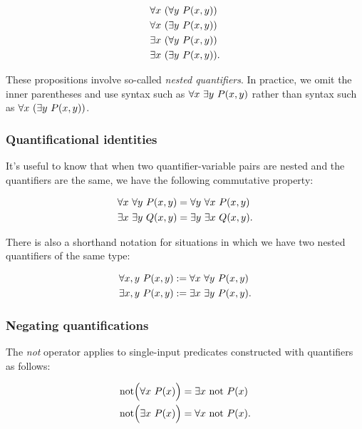 \begin{align*}
    &\forall x \text{ } (\forall y \text{ } P(x, y)) \\
    &\forall x \text{ } (\exists y \text{ } P(x, y)) \\
    &\exists x \text{ } (\forall y \text{ } P(x, y)) \\
    &\exists x \text{ } (\exists y \text{ } P(x, y)).
\end{align*}

These propositions involve so-called \textit{nested quantifiers}. In practice, we omit the inner parentheses and use syntax such as $\forall x \text{ } \exists y \text{ } P(x, y)$ rather than syntax such as $\forall x \text{ } (\exists y \text{ } P(x, y))$.

\subsubsection*{Quantificational identities}

It's useful to know that when two quantifier-variable pairs are nested and the quantifiers are the same, we have the following commutative property:

\begin{align*}
    &\forall x \text{ } \forall y \text{ } P(x, y) = \forall y \text{ } \forall x \text{ } P(x, y) \\
    &\exists x \text{ } \exists y \text{ } Q(x, y) = \exists y \text{ } \exists x \text{ } Q(x, y).
\end{align*}

There is also a shorthand notation for situations in which we have two nested quantifiers of the same type:

\begin{align*}
    &\forall x, y \text{ } P(x, y) := \forall x \text{ } \forall y \text{ } P(x, y) \\
    &\exists x, y \text{ } P(x, y) := \exists x \text{ } \exists y \text{ } P(x, y).
\end{align*}


\subsubsection*{Negating quantifications}

The \textit{not} operator applies to single-input predicates constructed with quantifiers as follows:

\begin{align*}
    \text{not}\Big( \forall x \text{ } P(x) \Big) &= \exists x \text{ } \text{not } P(x) \\
    \text{not}\Big( \exists x \text{ } P(x) \Big) &= \forall x \text{ } \text{not } P(x).
\end{align*}

